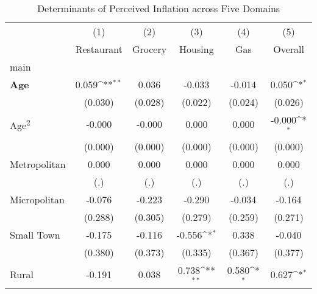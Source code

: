 \begin{table}[htbp]\centering
\def\sym#1{\ifmmode^{#1}\else\(^{#1}\)\fi}
\caption{Determinants of Perceived Inflation across Five Domains}
\begin{tabular}{l*{5}{c}}
\hline\hline
                    &\multicolumn{1}{c}{(1)}&\multicolumn{1}{c}{(2)}&\multicolumn{1}{c}{(3)}&\multicolumn{1}{c}{(4)}&\multicolumn{1}{c}{(5)}\\
                    &\multicolumn{1}{c}{Restaurant}&\multicolumn{1}{c}{Grocery}&\multicolumn{1}{c}{Housing}&\multicolumn{1}{c}{Gas}&\multicolumn{1}{c}{Overall}\\
\hline
main                &                     &                     &                     &                     &                     \\
\textbf{Age}        &       0.059\sym{**} &       0.036         &      -0.033         &      -0.014         &       0.050\sym{*}  \\
                    &     (0.030)         &     (0.028)         &     (0.022)         &     (0.024)         &     (0.026)         \\
Age\textsuperscript{2}&      -0.000         &      -0.000         &       0.000         &       0.000         &      -0.000\sym{*}  \\
                    &     (0.000)         &     (0.000)         &     (0.000)         &     (0.000)         &     (0.000)         \\
Metropolitan        &       0.000         &       0.000         &       0.000         &       0.000         &       0.000         \\
                    &         (.)         &         (.)         &         (.)         &         (.)         &         (.)         \\
Micropolitan        &      -0.076         &      -0.223         &      -0.290         &      -0.034         &      -0.164         \\
                    &     (0.288)         &     (0.305)         &     (0.279)         &     (0.259)         &     (0.271)         \\
Small Town          &      -0.175         &      -0.116         &      -0.556\sym{*}  &       0.338         &      -0.040         \\
                    &     (0.380)         &     (0.373)         &     (0.335)         &     (0.367)         &     (0.377)         \\
Rural               &      -0.191         &       0.038         &       0.738\sym{**} &       0.580\sym{*}  &       0.627\sym{*}  \\

\end{tabular}
\end{table}
